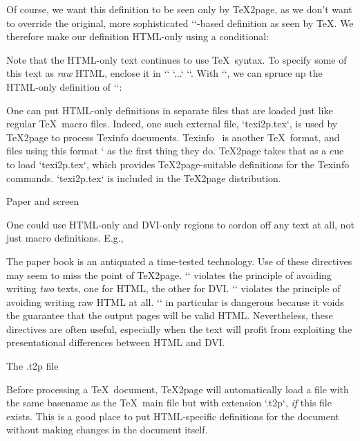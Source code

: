 \begintt
\def\bull{{\bf *}}
\endtt
Of course, we want this definition to be seen only
by \TeX2page, as we don’t want to override the
original, more sophisticated `\vrule`-based definition as seen
by \TeX.
We therefore make our
definition HTML-only
using a conditional:

\begintt
\ifx\shipout\UnDeFiNeD %
  \def\bull{{\bf *}}
\fi
\endtt

Note that the HTML-only text continues to use \TeX\ syntax.
To specify some of this text as {\em raw} HTML, enclose it
in `\rawhtml` `...` `\endrawhtml`.   With
`\rawhtml`, we can
spruce up the
HTML-only definition of `\bull`:

\begintt
\ifx\shipout\UnDeFiNeD %
  \def\bull{{\bf
  \rawhtml<span style="color: hsl(0,100%
  }}
\fi
\endtt

One can put HTML-only definitions in separate files
that are loaded just like regular \TeX\ macro files.
Indeed, one such external file, `texi2p.tex`, is used
by \TeX2page to process Texinfo
documents.  Texinfo~\cite{texinfo} is another \TeX\
format, and files using this format `
as the first thing they do.  \TeX2page takes that as a
cue to
load `texi2p.tex`, which provides \TeX2page-suitable
definitions for the Texinfo commands.  `texi2p.tex`
is included in the \TeX2page distribution.

\beginsection Paper and screen

One could use HTML-only and DVI-only regions to cordon off
any text at all, not just macro definitions.  E.g.,

\begintt
The paper book is
\ifx\shipout\UnDeFiNeD %
an antiquated
\else %
a time-tested
\fi
technology.
\endtt
Use of these directives may seem to miss the point of
\TeX2page.  `\ifx\shipout\UnDeFiNeD` violates the
principle of avoiding  writing {\em two} texts, one
for HTML, the other for DVI.  `\rawhtml` violates the
principle of avoiding writing raw HTML at all.
`\rawhtml` in particular is dangerous because it voids
the guarantee that the output pages will be valid HTML.
Nevertheless, these directives are often useful, especially when the
text will profit from exploiting the presentational differences between
HTML and DVI.

\beginsection The {.t2p} file

%
Before processing a \TeX\ document, \TeX2page will
automatically load a file
with the same basename as the \TeX\ main file but with
extension `.t2p`, {\em if} this file exists.  This
is a good place to put HTML-specific definitions for
the document without making  changes in the document
itself.


